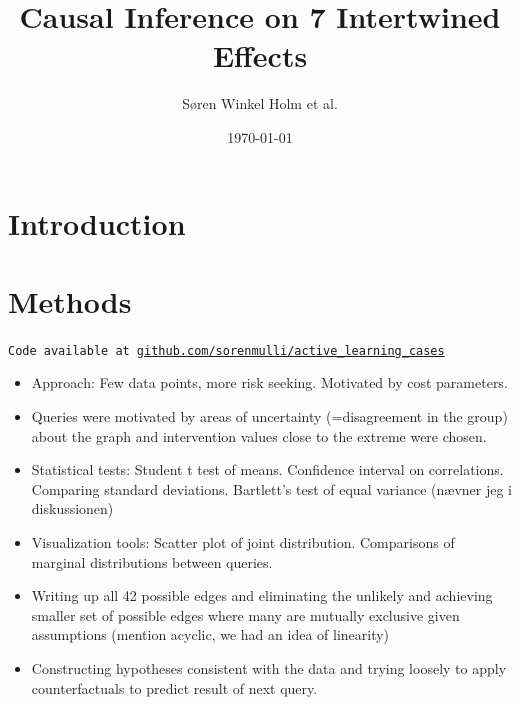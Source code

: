 \documentclass[12pt,fleqn,]{article}
\title{Causal Inference on 7 Intertwined Effects }
\author{Søren Winkel Holm et al.}
\date{\today}
\begin{document}
\maketitle

\begin{abstract}

\end{abstract}

\begin{multicols}{2}
	
	
\section{Introduction} 


\section{Methods}
\texttt{Code available at \url{github.com/sorenmulli/active_learning_cases}} \newline
\begin{itemize}
	\item Approach: Few data points, more risk seeking. Motivated by cost parameters.
	\item Queries were motivated by areas of uncertainty (=disagreement in the group) about the graph and intervention values close to the extreme were chosen.
	\item Statistical tests: Student t test of means. Confidence interval on correlations. Comparing standard deviations. Bartlett's test of equal variance (nævner jeg i diskussionen)
	\item Visualization tools: Scatter plot of joint distribution. Comparisons of marginal distributions between queries.
	\item Writing up all 42 possible edges and eliminating the unlikely and achieving smaller set of possible edges where many are mutually exclusive given assumptions (mention acyclic, we had an idea of linearity)
	\item Constructing hypotheses consistent with the data and trying loosely to apply counterfactuals to predict result of next query.
\end{itemize}





\end{multicols}
\end{document}
